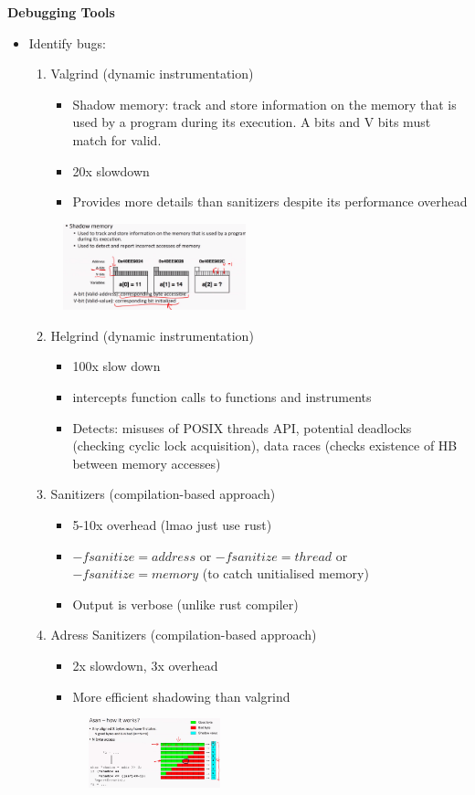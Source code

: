 \documentclass[10pt, landscape]{article}
\begin{document}
\begin{multicols}{4}
\textbf{Debugging Tools} \\
\begin{itemize}
    \item Identify bugs: 
    \begin{enumerate}
        \item Valgrind (dynamic instrumentation)
        \begin{itemize}
            \item Shadow memory: track and store information on the memory that is used by a program during its execution. A bits and V bits must match for valid.
            \item 20x slowdown
            \item Provides more details than sanitizers despite its performance overhead
        \end{itemize}
        \includegraphics*[width=6cm,height=2.5cm]{valgrind.png}

        \item Helgrind (dynamic instrumentation)
        \begin{itemize}
            \item 100x slow down
            \item intercepts function calls to functions and instruments
            \item Detects: misuses of POSIX threads API, potential deadlocks (checking cyclic lock acquisition), data races (checks existence of HB between memory accesses)
        \end{itemize}

        \item Sanitizers (compilation-based approach)
        \begin{itemize}
            \item 5-10x overhead (lmao just use rust)
            \item $-fsanitize=address$ or $-fsanitize=thread$ or $-fsanitize=memory$ (to catch unitialised memory)
            \item Output is verbose (unlike rust compiler)
        \end{itemize}

        \item Adress Sanitizers (compilation-based approach)
        \begin{itemize}
            \item 2x slowdown, 3x overhead
            \item More efficient shadowing than valgrind 
        \end{itemize}
        \includegraphics*[width=6cm,height=2cm]{asan.png}


\end{enumerate}
\end{itemize}
\end{multicols}
\end{document}
